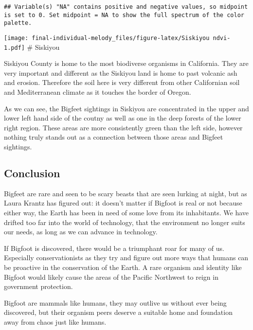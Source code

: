 \documentclass[
]{article}
\begin{document}
\begin{verbatim}
## Variable(s) "NA" contains positive and negative values, so midpoint is set to 0. Set midpoint = NA to show the full spectrum of the color palette.
\end{verbatim}

\texttt{[image: final-individual-melody\_files/figure-latex/Siskiyou ndvi-1.pdf]}
\# Siskiyou

Siskiyou County is home to the most biodiverse organisms in California.
They are very important and different as the Siskiyou land is home to
past volcanic ash and erosion. Therefore the soil here is very different
from other Californian soil and Mediterranean climate as it touches the
border of Oregon.

As we can see, the Bigfeet sightings in Siskiyou are concentrated in the
upper and lower left hand side of the coutny as well as one in the deep
forests of the lower right region. These areas are more consistently
green than the left side, however nothing truly stands out as a
connection between those areas and Bigfeet sightings.

\hypertarget{conclusion}{%
\subsection{Conclusion}\label{conclusion}}

Bigfeet are rare and seen to be scary beasts that are seen lurking at
night, but as Laura Krantz has figured out: it doesn't matter if Bigfoot
is real or not because either way, the Earth has been in need of some
love from its inhabitants. We have drifted too far into the world of
technology, that the environment no longer suits our needs, as long as
we can advance in technology.

If Bigfoot is discovered, there would be a triumphant roar for many of
us. Especially conservationists as they try and figure out more ways
that humans can be proactive in the conservation of the Earth. A rare
organism and identity like Bigfoot would likely cause the areas of the
Pacific Northwest to reign in government protection.

Bigfoot are mammals like humans, they may outlive us without ever being
discovered, but their organism peers deserve a suitable home and
foundation away from chaos just like humans.
\end{document}
